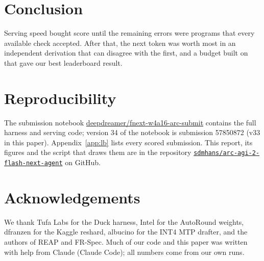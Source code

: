 \documentclass[11pt]{article}
\begin{document}
\section{Conclusion}
Serving speed bought score until the remaining errors were programs that every available check accepted. After that, the next token was worth most in an independent derivation that can disagree with the first, and a budget built on that gave our best leaderboard result.

\section*{Reproducibility}
The submission notebook \href{https://www.kaggle.com/code/deepdreamer/fnext-w4a16-arc-submit}{deepdreamer/fnext-w4a16-arc-submit} contains the full harness and serving code; version 34 of the notebook is submission 57850872 (v33 in this paper). Appendix~\ref{app:lb} lists every scored submission. This report, its figures and the script that draws them are in the repository \href{https://github.com/sdmhans/arc-agi-2-flash-next-agent}{\texttt{sdmhans/arc-agi-2-flash-next-agent}} on GitHub.



\section*{Acknowledgements}
We thank Tufa Labs for the Duck harness, Intel for the AutoRound weights, dfranzen for the Kaggle reshard, albucino for the INT4 MTP drafter, and the authors of REAP and FR-Spec. Much of our code and this paper was written with help from Claude (Claude Code); all numbers come from our own runs.
\end{document}
